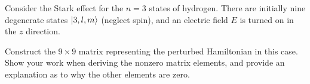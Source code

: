 \newcommand{\Eii}{E^{(1)}}
\newcommand{\vE}{\vec{E}}
\newcommand{\ao}{a_0}
\newcommand{\tht}{\theta}
\newcommand{\vr}{\vec{r}}
\newcommand{\drho}{\dd{\rho}}
\newcommand{\dtht}{\dd{\tht}}
\newcommand{\dcost}{\dd{(\cos\tht)}}
\newcommand{\dphi}{\dd{\phi}}

\begin{statement}{}
	Consider the Stark effect for the $n = 3$ states of hydrogen.  There are initially nine degenerate states $\ket{3, l, m}$ (neglect spin), and an electric field $E$ is turned on in the $z$ direction.
\end{statement}

\begin{problem}
	Construct the $9 \times 9$ matrix representing the perturbed Hamiltonian in this case.  Show your work when deriving the nonzero matrix elements, and provide an explanation as to why the other elements are zero.
\end{problem}


